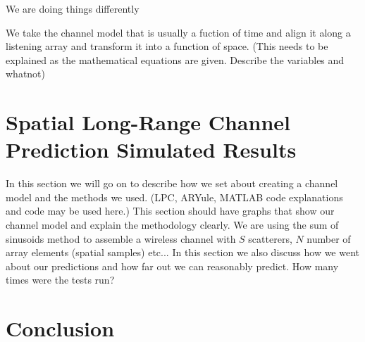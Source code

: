 \documentclass[11pt]{article} %
\begin{document}
We are doing things differently %

We take the channel model that is usually a fuction of time and align it along a listening array and transform it into a function of space. (This needs to be explained as the mathematical equations are given. Describe the variables and whatnot)

\section{Spatial Long-Range Channel Prediction Simulated Results}\label{simresults}

In this section we will go on to describe how we set about creating a channel model and the methods we used. (LPC, ARYule, MATLAB code explanations and code may be used here.) This section should have graphs that show our channel model and explain the methodology clearly. We are using the sum of sinusoids method to assemble a wireless channel with $S$ scatterers, $N$ number of array elements (spatial samples) etc... In this section we also discuss how we went about our predictions and how far out we can reasonably predict. How many times were the tests run?

\section{Conclusion}

\end{document}
